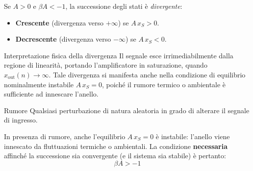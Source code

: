 Se $A > 0$ e $\beta A < -1$, la successione degli stati è \textit{divergente}:
\begin{itemize}[noitemsep, leftmargin=*]
    \item \textbf{Crescente} (divergenza verso $+\infty$) se $A\,x_S > 0$.
    \item \textbf{Decrescente} (divergenza verso $-\infty$) se $A\,x_S < 0$.
\end{itemize}

\begin{osservazione}{Interpretazione fisica della divergenza}
    Il segnale esce irrimediabilmente dalla regione di linearità, portando l'amplificatore in saturazione, quando $x_{\mathrm{out}}(n) \to \infty$. Tale divergenza si manifesta anche nella condizione di equilibrio nominalmente instabile $A\,x_S = 0$, poiché il rumore termico o ambientale è sufficiente ad innescare l'anello.
\end{osservazione}

\begin{definizione}{Rumore}
    Qualsiasi perturbazione di natura aleatoria in grado di alterare il segnale di ingresso.
\end{definizione}

\noindent
In presenza di rumore, anche l'equilibrio $A\,x_S = 0$ è instabile: l'anello viene innescato da fluttuazioni termiche o ambientali. La condizione \textbf{necessaria} affinché la successione sia convergente (e il sistema sia stabile) è pertanto:
\[
    \beta A > -1
\]

